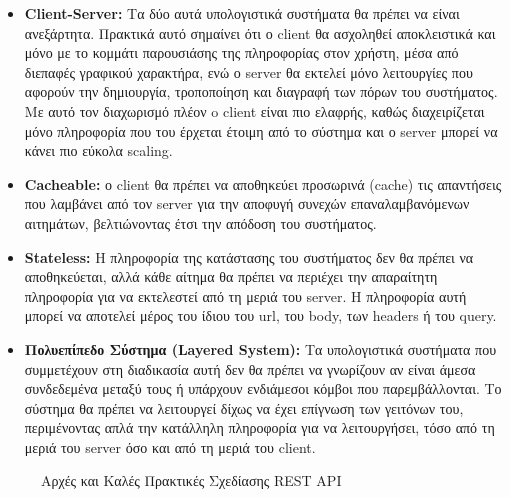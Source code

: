 \begin{itemize}
	\item \textbf{Client-Server:} Τα δύο αυτά υπολογιστικά συστήματα θα πρέπει να είναι ανεξάρτητα.
		Πρακτικά αυτό σημαίνει ότι ο client θα ασχοληθεί αποκλειστικά και μόνο με το κομμάτι παρουσιάσης της πληροφορίας στον χρήστη, μέσα από διεπαφές γραφικού χαρακτήρα, ενώ ο server θα εκτελεί μόνο λειτουργίες που αφορούν την δημιουργία, τροποποίηση και διαγραφή των πόρων του
		συστήματος. Με αυτό τον διαχωρισμό πλέον o client είναι πιο ελαφρής, καθώς διαχειρίζεται μόνο πληροφορία που του έρχεται έτοιμη από το σύστημα και ο server μπορεί να κάνει πιο εύκολα scaling.
	\item \textbf{Cacheable:} ο client θα πρέπει να αποθηκεύει προσωρινά (cache) τις
		απαντήσεις που λαμβάνει από τον server για την αποφυγή συνεχών επαναλαμβανόμενων αιτημάτων, βελτιώνοντας
		έτσι την απόδοση του συστήματος.
	\item \textbf{Stateless:} Η πληροφορία της κατάστασης του συστήματος δεν θα πρέπει να αποθηκεύεται,
		αλλά κάθε αίτημα θα πρέπει να περιέχει την απαραίτητη πληροφορία για να εκτελεστεί από τη μεριά του server. Η πληροφορία αυτή μπορεί να αποτελεί μέρος του ίδιου του url, του body, των headers ή του query.
	\item \textbf{Πολυεπίπεδο Σύστημα (Layered System):} Τα υπολογιστικά συστήματα που συμμετέχουν στη διαδικασία αυτή δεν
		θα πρέπει να γνωρίζουν αν είναι άμεσα συνδεδεμένα μεταξύ τους ή υπάρχουν ενδιάμεσοι κόμβοι που παρεμβάλλονται.
		Το σύστημα θα πρέπει να λειτουργεί δίχως να έχει επίγνωση των γειτόνων του, περιμένοντας απλά την κατάλληλη πληροφορία για να
		λειτουργήσει, τόσο από τη μεριά του server όσο και από τη μεριά του client.
\end{itemize}

\begin{figure}[!ht]
	\centering
	\caption[Αρχές και Καλές Πρακτικές Σχεδίασης REST API]{Αρχές και Καλές Πρακτικές Σχεδίασης REST API}
	\label{fig:rest_principles}
\end{figure}